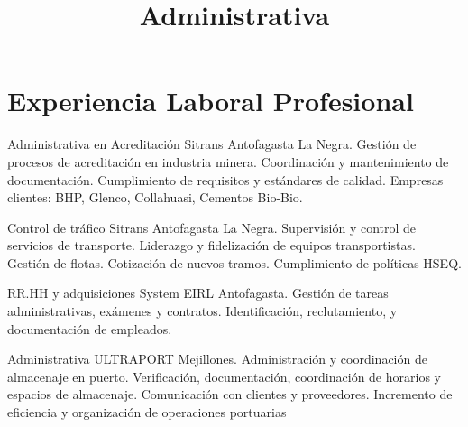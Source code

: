 \documentclass[draft,color,12pt,letterpaper,sans]{moderncv}
\title{Administrativa}
\begin{document}
\makecvtitle %

\section{Experiencia Laboral Profesional}

{Administrativa en Acreditación }
{\newline Sitrans}
{\newline Antofagasta}
{La Negra.}
{Gestión de procesos de acreditación en industria minera. 
\newline Coordinación y mantenimiento de documentación.
\newline Cumplimiento de requisitos y estándares de calidad.
\newline Empresas clientes: BHP, Glenco, Collahuasi, Cementos Bio-Bio.
\newline}

{Control de tráfico}
{\newline Sitrans}
{\newline Antofagasta}
{La Negra.}
{Supervisión y control de servicios de transporte.
\newline Liderazgo y fidelización de equipos transportistas. 
\newline Gestión de  flotas. Cotización de  nuevos tramos.
\newline Cumplimiento de políticas HSEQ.
\newline}

{RR.HH y adquisiciones}
{\newline System EIRL}
{\newline Antofagasta.}
{}
{Gestión de tareas administrativas, exámenes y contratos.
\newline Identificación, reclutamiento, y documentación de empleados.
\newline}

{Administrativa}
{\newline ULTRAPORT}
{\newline Mejillones.}
{}
{Administración y coordinación de almacenaje en puerto.
\newline Verificación, documentación, coordinación de horarios y espacios de almacenaje.
\newline Comunicación con clientes y proveedores.
\newline Incremento de eficiencia y organización de operaciones portuarias
\newline}
\end{document}

